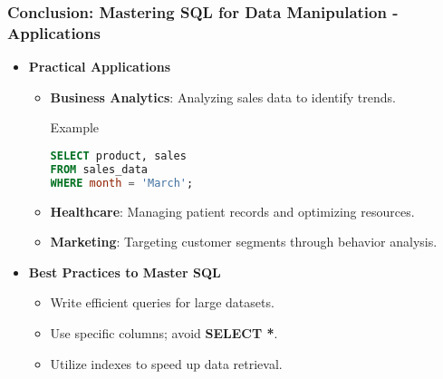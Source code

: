 \documentclass[aspectratio=169]{beamer}
\begin{document}
\begin{frame}[fragile]
    \frametitle{Conclusion: Mastering SQL for Data Manipulation - Applications}
    \begin{itemize}
        \item \textbf{Practical Applications}
            \begin{itemize}
                \item \textbf{Business Analytics}: Analyzing sales data to identify trends.
                    \begin{block}{Example}
                        \begin{lstlisting}[language=SQL, backgroundcolor=lightgray]
SELECT product, sales 
FROM sales_data 
WHERE month = 'March';
                        \end{lstlisting}
                    \end{block}
                
                \item \textbf{Healthcare}: Managing patient records and optimizing resources.
                
                \item \textbf{Marketing}: Targeting customer segments through behavior analysis.
            \end{itemize}
        
        \item \textbf{Best Practices to Master SQL}
            \begin{itemize}
                \item Write efficient queries for large datasets.
                \item Use specific columns; avoid \textbf{SELECT *}.
                \item Utilize indexes to speed up data retrieval.
            \end{itemize}
    \end{itemize}
\end{frame}
\end{document}
